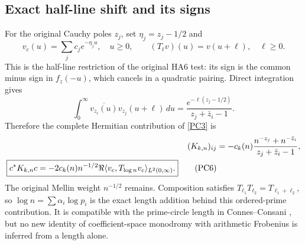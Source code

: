 \documentclass[11pt,a4paper]{article}
\theoremstyle{definition}\newtheorem{definition}[theorem]{Definition}
\begin{document}
\subsection{Exact half-line shift and its signs}
For the original Cauchy poles $z_j$, set $\eta_j=z_j-1/2$ and
\begin{equation}
 v_c(u)=\sum_j c_j e^{-\eta_ju},\quad u\ge0,
 \qquad (T_\ell v)(u)=v(u+\ell),\quad \ell\ge0.              \tag{PC4}\label{PC4}
\end{equation}
This is the half-line restriction of the original HA6 test: its sign is the common minus sign in $f_z(-u)$, which cancels in a quadratic pairing. Direct integration gives
\begin{equation}
 \int_0^\infty\overline{v_{z_i}(u)}v_{z_j}(u+\ell)\,du
 =\frac{e^{-\ell(z_j-1/2)}}{z_j+\bar z_i-1}.
                                                               \tag{PC5}\label{PC5}
\end{equation}
Therefore the complete Hermitian contribution of \eqref{PC3} is
\begin{align}
 (K_{k,n})_{ij}&=-c_k(n)\frac{n^{-z_j}+n^{-\bar z_i}}
                                      {z_j+\bar z_i-1},\notag\\
 \boxed{c^*K_{k,n}c
 =-2c_k(n)n^{-1/2}\Re\langle v_c,T_{\log n}v_c\rangle_{L^2(0,\infty)}.}
                                                               \tag{PC6}\label{PC6}
\end{align}
The original Mellin weight $n^{-1/2}$ remains. Composition satisfies
$T_{\ell_1}T_{\ell_2}=T_{\ell_1+\ell_2}$, so
$\log n=\sum\alpha_i\log p_i$ is the exact length addition behind this ordered-prime contribution. It is compatible with the prime-circle length in Connes--Consani \cite{CC}, but no new identity of coefficient-space monodromy with arithmetic Frobenius is inferred from a length alone.
\end{document}

